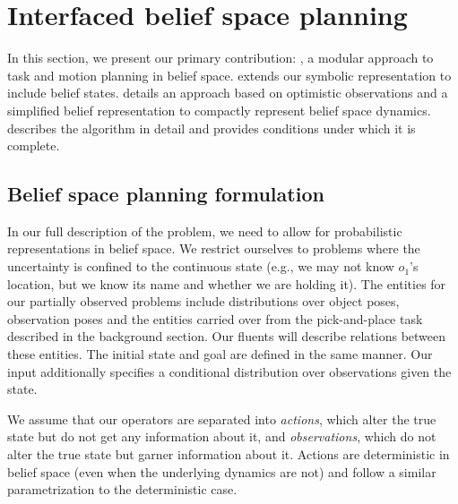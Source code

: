 \section{Interfaced belief space planning}
In this section, we present our primary contribution: \ibsp, a modular
approach to task and motion planning in belief
space.  extends our symbolic
representation to include belief states.  details
an approach based on optimistic observations and a simplified belief
representation to compactly represent belief space dynamics.
 describes the \ibsp{} algorithm in detail and provides conditions
under which it is complete.


\subsection{Belief space planning formulation}
\label{sec-bsp-formulation}
In our full description of the problem, we need to allow for
probabilistic representations in belief space. We restrict ourselves
to problems where the uncertainty is confined to the continuous state
(e.g., %
we may not know $o_1$'s location, but we know its name and whether
we are holding it). The entities for our partially observed problems include distributions over object poses, observation poses and the entities carried over from the pick-and-place task described in the background section.
Our fluents will describe relations between these entities. The
initial state and goal are defined in the same manner. Our input
additionally specifies a conditional distribution over observations
given the state.

We assume that our operators are separated into \emph{actions}, which
alter the true state but do not get any information about it, and
\emph{observations}, which do not alter the true state but garner
information about it. Actions are deterministic in belief space
(even when the underlying dynamics are not) and follow a similar
parametrization to the deterministic case.

